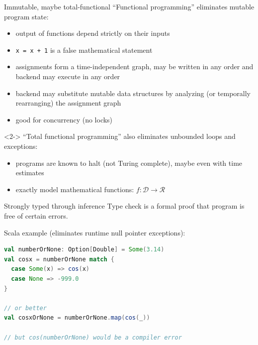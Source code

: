 \documentclass{beamer}
\begin{document}
\begin{frame}{Immutable, maybe total-functional}
\vfill
``Functional programming'' eliminates mutable program state:
\begin{itemize}
\item output of functions depend strictly on their inputs
\item {\tt \small x = x + 1} is a false mathematical statement
\item assignments form a time-independent graph, may be written in any order and backend may execute in any order
\item backend may substitute mutable data structures by analyzing (or temporally rearranging) the assignment graph
\item good for concurrency (no locks)
\end{itemize}

\vfill
\begin{uncoverenv}<2->
``Total functional programming'' also eliminates unbounded loops and exceptions:
\begin{itemize}
\item programs are known to halt (not Turing complete), maybe even with time estimates
\item exactly model mathematical functions: $f: \mathcal{D} \to \mathcal{R}$
\end{itemize}
\end{uncoverenv}
\end{frame}

\begin{frame}[fragile]{Strongly typed through inference}
\vfill
Type check is a formal proof that program is free of certain errors.

\vfill
Scala example (eliminates runtime null pointer exceptions):
\begin{lstlisting}[language=scala]
val numberOrNone: Option[Double] = Some(3.14)
val cosx = numberOrNone match {
  case Some(x) => cos(x)
  case None => -999.0
}

// or better
val cosxOrNone = numberOrNone.map(cos(_))

// but cos(numberOrNone) would be a compiler error
\end{lstlisting}
\end{frame}
\end{document}

